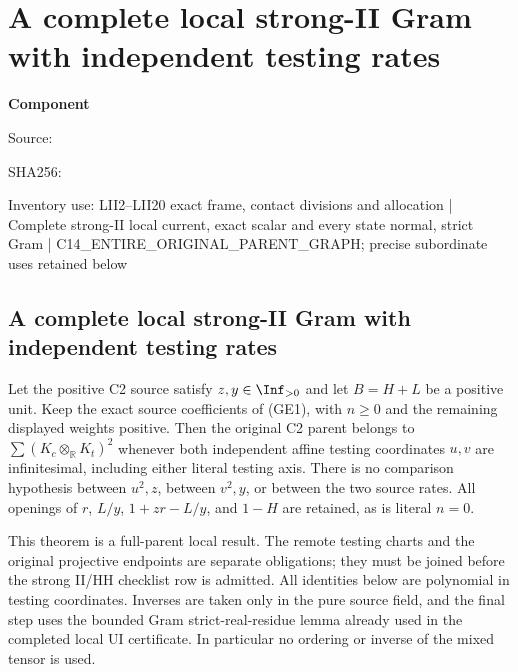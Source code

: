 \chapter{A complete local strong-II Gram with independent testing rates}
\label{component:pe16499ccc4c6}
\noindent\textbf{Component }\par
{\small\noindent Source: \par}
{\small\noindent SHA256: \par}
{\small\noindent Inventory use: LII2--LII20 exact frame, contact divisions and allocation | Complete strong-II local current, exact scalar and every state normal, strict Gram | C14\_\allowbreak{}ENTIRE\_\allowbreak{}ORIGINAL\_\allowbreak{}PARENT\_\allowbreak{}GRAPH; precise subordinate uses retained below\par}
\medskip
\section{A complete local strong-II Gram with independent testing rates}
\label{pe16499ccc4c6:sec:r7-local-strong-II}

\begin{theorem}
Let the positive C2 source satisfy $z,y\in\Inf_{>0}$ and let
$B=H+L$ be a positive unit.  Keep the exact source coefficients of
(GE1), with $n\geq0$ and the remaining displayed weights positive.
Then the original C2 parent belongs to $\sum(K_c\otimes_{\mathbb R}
K_t)^2$ whenever both independent affine testing coordinates $u,v$
are infinitesimal, including either literal testing axis.
There is no comparison hypothesis between $u^2,z$, between $v^2,y$,
or between the two source rates.  All openings of $r$, $L/y$,
$1+zr-L/y$, and $1-H$ are retained, as is literal $n=0$.
\end{theorem}

This theorem is a full-parent local result.  The remote testing charts
and the original projective endpoints are separate obligations; they
must be joined before the strong II/HH checklist row is admitted.
All identities below are polynomial in testing coordinates.  Inverses
are taken only in the pure source field, and the final step uses the
bounded Gram strict-real-residue lemma already used in the completed
local UI certificate.  In particular no ordering or inverse of the
mixed tensor is used.

